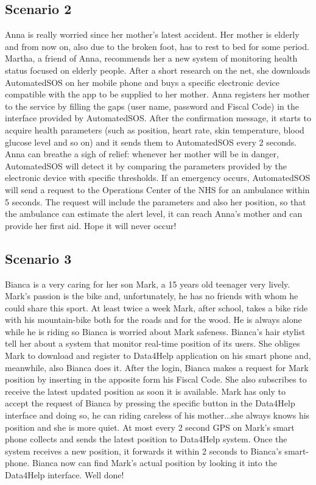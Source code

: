     \subsection{Scenario 2}
    Anna is really worried since her mother's latest accident. Her mother is elderly and from now on, also due to the broken foot, has to rest to bed for some period. Martha, a friend of Anna, recommends her a new system of monitoring health status focused on elderly people. After a short research on the net, she downloads AutomatedSOS on her mobile phone and buys a specific electronic device compatible with the app to be supplied to her mother. 
    Anna registers her mother to the service by filling the gaps (user name, password and Fiscal Code) in the interface provided by AutomatedSOS.
    After the confirmation message, it starts to acquire health parameters (such as position, heart rate, skin temperature, blood glucose level and so on) and it sends them to AutomatedSOS every 2 seconds.
    Anna can breathe a sigh of relief: whenever her mother will be in danger, AutomatedSOS will detect it by comparing the parameters provided by the electronic device with specific thresholds. 
    If an emergency occurs, AutomatedSOS will send a request to the Operations Center of the NHS for an ambulance within 5 seconds. The request will include the parameters and also her position, so that the ambulance can estimate the alert level, it can reach Anna’s mother and can provide her first aid.
    Hope it will never occur!

    \subsection{Scenario 3}
    Bianca is a very caring for her son Mark, a 15 years old teenager very lively.
    Mark’s passion is the bike and, unfortunately, he has no friends with whom he could share this sport. At least twice a week Mark, after school, takes a bike ride with his mountain-bike both for the roads and for the wood.
    He is always alone while he is riding so Bianca is worried about Mark safeness.
    Bianca’s hair stylist tell her about a system that monitor real-time position of its users.
    She obliges Mark to download and register to Data4Help application on his smart phone and, meanwhile, also Bianca does it.
    After the login, Bianca makes a request for Mark position by inserting in the apposite form his Fiscal Code. She also subscribes to receive the latest updated position as soon it is available. Mark has only to accept the request of Bianca by pressing the specific button in the Data4Help interface and doing so, he can riding careless of his mother...she always knows his position and she is more quiet. At most every 2 second GPS on Mark’s smart phone collects and sends the latest position to Data4Help system. Once the system receives a new position, it forwards it within 2 seconds to Bianca’s smart-phone. Bianca now can find Mark’s actual position by looking it into the Data4Help interface. 
    Well done!
    
